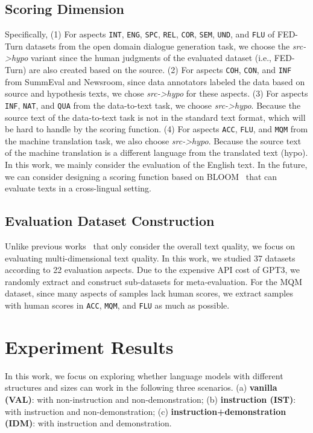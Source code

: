 \subsection{Scoring Dimension} Specifically, (1) For aspects \texttt{INT}, \texttt{ENG}, \texttt{SPC}, \texttt{REL}, \texttt{COR}, \texttt{SEM}, \texttt{UND}, and \texttt{FLU} of FED-Turn datasets from the open domain dialogue generation task, we choose the \textit{src->hypo} variant since the human judgments of the evaluated dataset (i.e., FED-Turn) are also created based on the source. (2) For aspects \texttt{COH}, \texttt{CON}, and \texttt{INF} from SummEval and Newsroom, since data annotators labeled the data based on source and hypothesis texts, we chose \textit{src->hypo} for these aspects. (3) For aspects \texttt{INF}, \texttt{NAT}, and \texttt{QUA} from the data-to-text task, we choose \textit{src->hypo}.  Because the source text of the data-to-text task is not in the standard text format, which will be hard to handle by the scoring function. (4) For aspects \texttt{ACC}, \texttt{FLU}, and \texttt{MQM} from the machine translation task, we also choose \textit{src->hypo}. Because the source text of the machine translation is a different language from the translated text (hypo). In this work, we mainly consider the evaluation of the English text. In the future, we can consider designing a scoring function based on BLOOM~\cite{google:bloom} that can evaluate texts in a cross-lingual setting.

\subsection{Evaluation Dataset Construction} Unlike previous works~\cite{carp:2021,SEScore2:2022,wenda:2022,robust:2022} that only consider the overall text quality, we focus on evaluating multi-dimensional text quality. In this work, we studied 37 datasets according to 22 evaluation aspects. Due to the expensive API cost of GPT3, we randomly extract and construct sub-datasets for meta-evaluation. For the MQM dataset, since many aspects of samples lack human scores, we extract samples with human scores in \texttt{ACC}, \texttt{MQM}, and \texttt{FLU} as much as possible. 

\section{Experiment Results}

In this work, we focus on exploring whether language models with different structures and sizes can work in the following three scenarios. (a) \textbf{vanilla (VAL)}: with non-instruction and non-demonstration; (b) \textbf{instruction (IST)}: with instruction and non-demonstration; (c) \textbf{instruction+demonstration (IDM)}: with instruction and demonstration.

